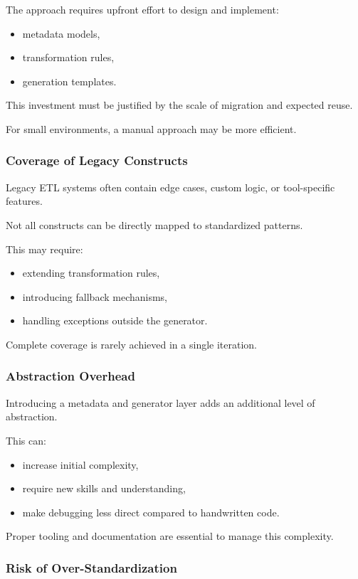 \documentclass[11pt,a4paper]{article}
\begin{document}
The approach requires upfront effort to design and implement:
\begin{itemize}
  \item metadata models,
  \item transformation rules,
  \item generation templates.
\end{itemize}

This investment must be justified by the scale of migration and expected reuse.

For small environments, a manual approach may be more efficient.

\subsubsection{Coverage of Legacy Constructs}

Legacy ETL systems often contain edge cases, custom logic, or tool-specific features.

Not all constructs can be directly mapped to standardized patterns.

This may require:
\begin{itemize}
  \item extending transformation rules,
  \item introducing fallback mechanisms,
  \item handling exceptions outside the generator.
\end{itemize}

Complete coverage is rarely achieved in a single iteration.

\subsubsection{Abstraction Overhead}

Introducing a metadata and generator layer adds an additional level of abstraction.

This can:
\begin{itemize}
  \item increase initial complexity,
  \item require new skills and understanding,
  \item make debugging less direct compared to handwritten code.
\end{itemize}

Proper tooling and documentation are essential to manage this complexity.

\subsubsection{Risk of Over-Standardization}
\end{document}
